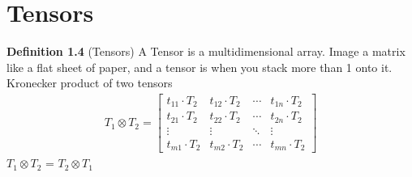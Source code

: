 \documentclass{report}
\begin{document}
\section{Tensors}
\textbf{Definition 1.4} (Tensors) A Tensor is a multidimensional array. Image a matrix like a flat sheet of paper, and a tensor is when you stack more than 1 onto it.\\

\noindent Kronecker product of two tensors
\begin{align}
    T_1 \otimes T_2 = \begin{bmatrix}
    t_{11} \cdot T_2 & t_{12} \cdot T_2 & \cdots & t_{1n} \cdot T_2 \\
    t_{21} \cdot T_2 & t_{22} \cdot T_2 & \cdots & t_{2n} \cdot T_2 \\
    \vdots & \vdots & \ddots & \vdots \\
    t_{m1} \cdot T_2 & t_{m2} \cdot T_2 & \cdots & t_{mn} \cdot T_2
\end{bmatrix}
\end{align}
$T_1 \otimes T_2$ = $T_2 \otimes T_1$
\section{}
\end{document}
